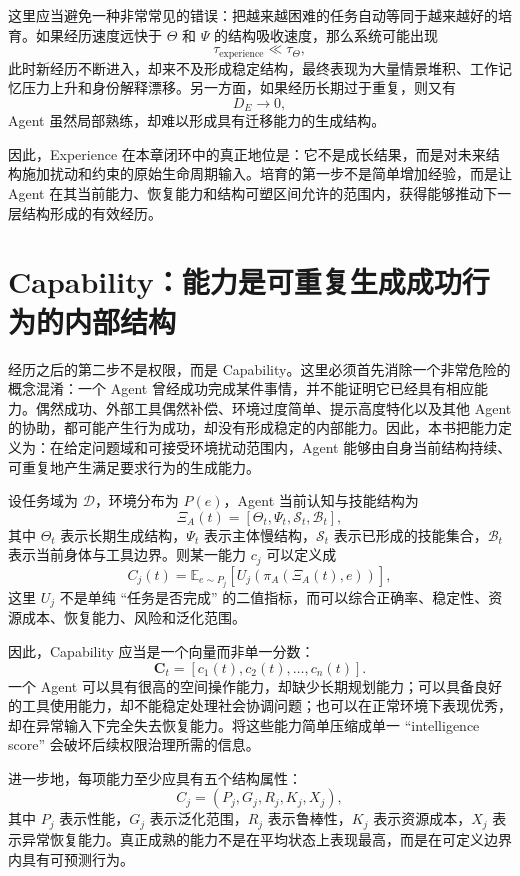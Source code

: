 这里应当避免一种非常常见的错误：把越来越困难的任务自动等同于越来越好的培育。如果经历速度远快于 $\Theta$ 和 $\Psi$ 的结构吸收速度，那么系统可能出现
\[
\tau_{\mathrm{experience}}
\ll
\tau_{\Theta},
\]
此时新经历不断进入，却来不及形成稳定结构，最终表现为大量情景堆积、工作记忆压力上升和身份解释漂移。另一方面，如果经历长期过于重复，则又有
\[
D_E\rightarrow 0,
\]
Agent 虽然局部熟练，却难以形成具有迁移能力的生成结构。

因此，Experience 在本章闭环中的真正地位是：它不是成长结果，而是对未来结构施加扰动和约束的原始生命周期输入。培育的第一步不是简单增加经验，而是让 Agent 在其当前能力、恢复能力和结构可塑区间允许的范围内，获得能够推动下一层结构形成的有效经历。

\section{Capability：能力是可重复生成成功行为的内部结构}

经历之后的第二步不是权限，而是 Capability。这里必须首先消除一个非常危险的概念混淆：一个 Agent 曾经成功完成某件事情，并不能证明它已经具有相应能力。偶然成功、外部工具偶然补偿、环境过度简单、提示高度特化以及其他 Agent 的协助，都可能产生行为成功，却没有形成稳定的内部能力。因此，本书把能力定义为：在给定问题域和可接受环境扰动范围内，Agent 能够由自身当前结构持续、可重复地产生满足要求行为的生成能力。

设任务域为 $\mathcal D$，环境分布为 $P(e)$，Agent 当前认知与技能结构为
\[
\Xi_A(t)
=
[
\Theta_t,
\Psi_t,
\mathcal S_t,
\mathcal B_t
],
\]
其中 $\Theta_t$ 表示长期生成结构，$\Psi_t$ 表示主体慢结构，$\mathcal S_t$ 表示已形成的技能集合，$\mathcal B_t$ 表示当前身体与工具边界。则某一能力 $c_j$ 可以定义成
\[
C_j(t)
=
\mathbb E_{e\sim P_j}
\left[
U_j(
\pi_A(\Xi_A(t),e)
)
\right],
\]
这里 $U_j$ 不是单纯 ``任务是否完成'' 的二值指标，而可以综合正确率、稳定性、资源成本、恢复能力、风险和泛化范围。

因此，Capability 应当是一个向量而非单一分数：
\[
\mathbf C_t
=
[
c_1(t),
c_2(t),
\ldots,
c_n(t)
].
\]
一个 Agent 可以具有很高的空间操作能力，却缺少长期规划能力；可以具备良好的工具使用能力，却不能稳定处理社会协调问题；也可以在正常环境下表现优秀，却在异常输入下完全失去恢复能力。将这些能力简单压缩成单一 ``intelligence score'' 会破坏后续权限治理所需的信息。

进一步地，每项能力至少应具有五个结构属性：
\[
C_j
=
(
P_j,
G_j,
R_j,
K_j,
X_j
),
\]
其中 $P_j$ 表示性能，$G_j$ 表示泛化范围，$R_j$ 表示鲁棒性，$K_j$ 表示资源成本，$X_j$ 表示异常恢复能力。真正成熟的能力不是在平均状态上表现最高，而是在可定义边界内具有可预测行为。

